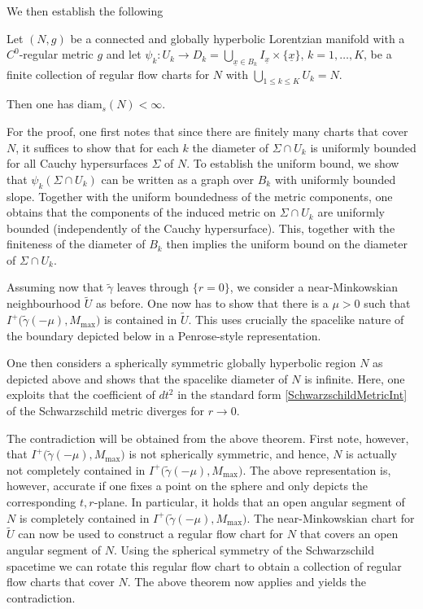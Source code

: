 \documentclass[reqno]{article}
\newcommand{\diam}{\mathrm{diam}}
\newcommand{\ux}{\underline{x}}
\newcommand{\Mmax}{M_{\mathrm{max}}}
\begin{document}
We then establish the following
\begin{theorem*}
Let $(N,g)$ be a connected and globally hyperbolic Lorentzian manifold with a $C^0$-regular metric $g$ and let $\psi_k : U_k \to D_k = \bigcup_{\ux \in B_k} I_{\ux} \times \{\ux\}$, $k = 1, \ldots, K$, be a finite collection of regular flow charts for $N$ with $\bigcup_{1 \leq k \leq K} U_k = N$.

Then one has $\diam_s(N) < \infty$.
\end{theorem*}
For the proof, one first notes that since there are finitely many charts that cover $N$, it suffices to show that for each $k$ the diameter of $\Sigma \cap U_k$ is uniformly bounded for all Cauchy hypersurfaces $\Sigma$ of $N$. To establish the uniform bound, we show that $\psi_k(\Sigma \cap U_k)$ can be written as a graph over $B_k$ with uniformly bounded slope. Together with the uniform boundedness of the metric components, one obtains that the components of the induced metric on $\Sigma \cap U_k$ are uniformly bounded (independently of the Cauchy hypersurface). This, together with the finiteness of the diameter of $B_k$ then implies the uniform bound on the diameter of $\Sigma \cap U_k$.

Assuming now that $\tilde{\gamma}$ leaves through $\{r=0\}$, we consider a near-Minkowskian neighbourhood $\tilde{U}$ as before. One now has to show that there is a $\mu >0$ such that $I^+\big(\tilde{\gamma}(-\mu), \Mmax\big)$ is contained in $\tilde{U}$. This uses crucially the spacelike nature of the boundary depicted below in a Penrose-style representation.
\begin{center}
\def\svgwidth{9cm}

\end{center}
One then considers a spherically symmetric globally hyperbolic region $N$ as depicted above and shows that the spacelike diameter of $N$ is infinite. Here, one exploits that the coefficient of $dt^2$ in the standard form \eqref{SchwarzschildMetricInt} of the Schwarzschild metric diverges for $r \to 0$.  

The contradiction will be obtained from the above theorem. First note, however, that $I^+\big(\tilde{\gamma}(-\mu), \Mmax\big)$ is not spherically symmetric, and hence, $N$ is actually not completely contained in $I^+\big(\tilde{\gamma}(-\mu), \Mmax\big)$. The above representation is, however, accurate if one fixes a point on the sphere and only depicts the corresponding $t,r$-plane. In particular, it holds that an open angular segment of $N$ is completely contained in $I^+\big(\tilde{\gamma}(-\mu), \Mmax\big)$. The near-Minkowskian chart for $\tilde{U}$ can now be used to construct a regular flow chart for $N$ that covers an open angular segment of $N$. Using the spherical symmetry of the Schwarzschild spacetime we can rotate this regular flow chart to obtain a collection of regular flow charts that cover $N$. The above theorem now applies and yields the contradiction.
\end{document}

